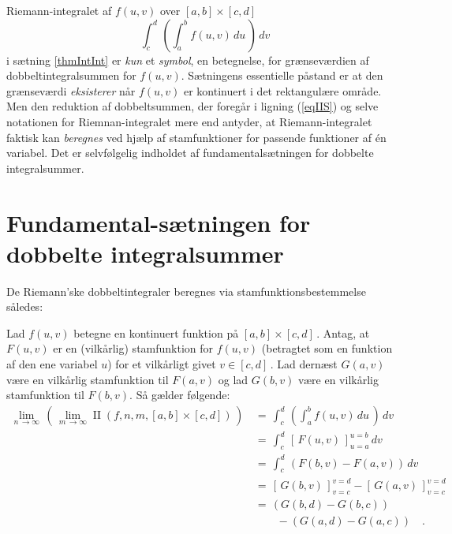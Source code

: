 \begin{think}
Riemann-integralet af $f(u,v)$ over $[a, b]\times [c,d]\,$
\begin{equation}
\int_{c}^{d}\, \left(
\int_{a}^{b} f(u,v)\, du \, \right)\, dv
\end{equation}
i sætning \ref{thmIntInt} er \emph{kun} et \emph{symbol}, en betegnelse, for grænseværdien af dobbeltintegralsummen for $f(u,v)$. Sætningens essentielle
påstand er at den grænseværdi \emph{eksisterer} når $f(u,v)$ er kontinuert i det rektangulære område.
Men den reduktion af dobbeltsummen, der foregår i ligning (\ref{eqIIS}) og selve notationen for Riemnan-integralet mere end antyder, at
Riemann-integralet faktisk kan \emph{beregnes} ved hjælp af stamfunktioner for passende funktioner af \'{e}n variabel. Det er selvfølgelig indholdet af
fundamentalsætningen for dobbelte integralsummer.
\end{think}




\section{Fundamental-sætningen for dobbelte integralsummer}\label{secFundamII}

De Riemann'ske dobbeltintegraler beregnes via stamfunktionsbestemmelse således:

\begin{theorem}\label{thmAnalyseFundamental2}
Lad $f(u,v)$ betegne en kontinuert funktion på $[a, b]\times [c,d]\,$. Antag, at $F(u,v)$ er en (vilkårlig) stamfunktion for $f(u, v)$ (betragtet som en funktion af den ene variabel $u$) for et vilkårligt givet $v \in [c, d]\,$. Lad dernæst $G(a,v)$ være en vilkårlig stamfunktion til $F(a, v)$ og lad $G(b, v)$ være en vilkårlig stamfunktion til $F(b, v)$.
Så gælder følgende:
\begin{equation} \label{eqDobbeltInt2}
\begin{aligned}
\lim_{n\, \to \infty}\, \left( \,\lim_{m\, \to \infty} \operatorname{II}(f,n,m,
[a, b]\times [c,d])\,\right) \, &= \,
\int_{c}^{d}\, \left(
\int_{a}^{b} f(u,v)\, du \, \right)\, dv  \\
&= \,  \int_{c}^{d}\, [\, F(u,v)\,]_{u=a}^{u=b}  \, dv \\
&= \,  \int_{c}^{d}\, \left(F(b,v) - F(a,v)\right)  \, dv \\
&= \,[\, G(b,v)\,]_{v=c}^{v=d} - [\,G(a,v)\,]_{v=c}^{v=d}\\
&= \,(G(b,d) - G(b,c))\\
& \qquad  - (G(a,d) - G(a,c)) \quad .
\end{aligned}
\end{equation}
\end{theorem}
\vspace{0.2cm}


